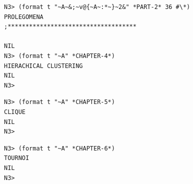 \documentclass{article}
\begin{document}
\bigskip

\bigskip
\bigskip

\begin{lstlisting}[language=sectitle]
N3> (format t "~A~&;~v@{~A~:*~}~2&" *PART-2* 36 #\*)
PROLEGOMENA
;************************************

NIL
N3> (format t "~A" *CHAPTER-4*)
HIERACHICAL CLUSTERING
NIL
N3> 
\end{lstlisting}
{}

\bigskip

\bigskip
\bigskip

\begin{lstlisting}[language=sectitle]
N3> (format t "~A" *CHAPTER-5*)
CLIQUE
NIL
N3> 
\end{lstlisting}

\bigskip

\bigskip
\bigskip

\begin{lstlisting}[language=sectitle]
N3> (format t "~A" *CHAPTER-6*)
TOURNOI
NIL
N3> 
\end{lstlisting}

\bigskip

\bigskip
\bigskip
\end{document}
